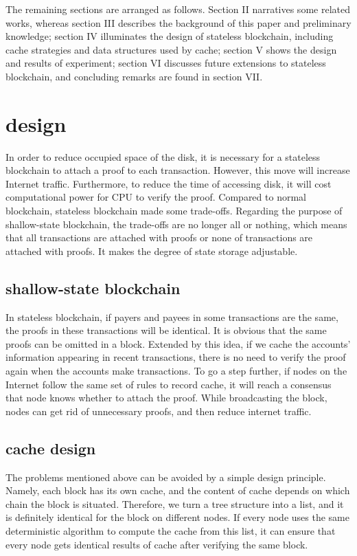 \documentclass[conference]{IEEEtran}
\begin{document}
The remaining sections are arranged as follows. Section II narratives some related works, whereas section III describes the background of this paper and preliminary knowledge; section IV illuminates the design of stateless blockchain, including cache strategies and data structures used by cache; section V shows the design and results of experiment; section VI discusses future extensions to stateless blockchain, and concluding remarks are found in section VII.


\section{design}
In order to reduce occupied space of the disk, it is necessary for a stateless blockchain to attach a proof to each transaction. However, this move will increase Internet traffic. Furthermore, to reduce the time of accessing disk, it will cost computational power for CPU to verify the proof.
Compared to normal blockchain, stateless blockchain made some trade-offs. Regarding the purpose of shallow-state blockchain, the trade-offs are no longer all or nothing, which means that all transactions are attached with proofs or none of transactions are attached with proofs. It makes the degree of state storage adjustable.

\subsection{shallow-state blockchain}
In stateless blockchain, if payers and payees in some transactions are the same, the proofs in these transactions will be identical. It is obvious that the same proofs can be omitted in a block. Extended by this idea, if we cache the accounts’ information appearing in recent transactions, there is no need to verify the proof again when the accounts make transactions. To go a step further, if nodes on the Internet follow the same set of rules to record cache, it will reach a consensus that node knows whether to attach the proof. While broadcasting the block, nodes can get rid of unnecessary proofs, and then reduce internet traffic.

\subsection{cache design}
The problems mentioned above can be avoided by a simple design principle. Namely, each block has its own cache, and the content of cache depends on which chain the block is situated. Therefore, we turn a tree structure into a list, and it is definitely identical for the block on different nodes. If every node uses the same deterministic algorithm to compute the cache from this list, it can ensure that every node gets identical results of cache after verifying the same block.
\end{document}
